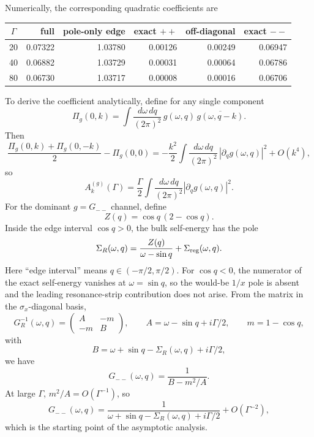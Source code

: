 \documentclass[aps,prx,preprint,amsmath,amssymb]{revtex4-2}
\begin{document}
Numerically, the corresponding quadratic coefficients are
\begin{center}
\begin{tabular}{crrrrr}
\toprule
\(\Gamma\) & full & pole-only edge & exact \(++\) & off-diagonal & exact \(--\) \\
\midrule
20 & 0.07322 & 1.03780 & 0.00126 & 0.00249 & 0.06947 \\
40 & 0.06882 & 1.03729 & 0.00031 & 0.00064 & 0.06786 \\
80 & 0.06730 & 1.03717 & 0.00008 & 0.00016 & 0.06706 \\
\bottomrule
\end{tabular}
\end{center}

To derive the coefficient analytically, define for any single component
\begin{equation}
\Pi_g(0,k)=
\int\frac{d\omega\,dq}{(2\pi)^2}\,
g(\omega,q)\,\overline{g(\omega,q-k)}.
\end{equation}
Then
\begin{equation}\label{eq:Ak-gradient-app}
\frac{\Pi_g(0,k)+\Pi_g(0,-k)}{2}-\Pi_g(0,0)
=
-\frac{k^2}{2}\int\frac{d\omega\,dq}{(2\pi)^2}\,
|\partial_q g(\omega,q)|^2
+O(k^4),
\end{equation}
so
\begin{equation}
A_k^{(g)}(\Gamma)
=
\frac{\Gamma}{2}\int\frac{d\omega\,dq}{(2\pi)^2}
|\partial_q g(\omega,q)|^2.
\end{equation}
For the dominant \(g=G_{--}\) channel, define
\[
Z(q)=\cos q\,(2-\cos q).
\]
Inside the edge interval \(\cos q>0\), the bulk self-energy has the pole
\[
\Sigma_R(\omega,q)=\frac{Z(q)}{\omega-\sin q}+\Sigma_{\rm reg}(\omega,q).
\]
Here ``edge interval'' means \(q\in(-\pi/2,\pi/2)\).  For \(\cos q<0\), the
numerator of the exact self-energy vanishes at \(\omega=\sin q\), so the
would-be \(1/x\) pole is absent and the leading resonance-strip contribution
does not arise.  From the matrix in the \(\sigma_x\)-diagonal basis,
\[
G_R^{-1}(\omega,q)=
\begin{pmatrix}
A & -m\\
-m & B
\end{pmatrix},
\qquad
A=\omega-\sin q+i\Gamma/2,
\qquad
m=1-\cos q,
\]
with
\[
B=\omega+\sin q-\Sigma_R(\omega,q)+i\Gamma/2,
\]
we have
\[
G_{--}(\omega,q)=\frac{1}{B-m^2/A}.
\]
At large \(\Gamma\), \(m^2/A=O(\Gamma^{-1})\), so
\[
G_{--}(\omega,q)
=
\frac{1}{\omega+\sin q-\Sigma_R(\omega,q)+i\Gamma/2}
+O(\Gamma^{-2}),
\]
which is the starting point of the asymptotic analysis.
\end{document}
